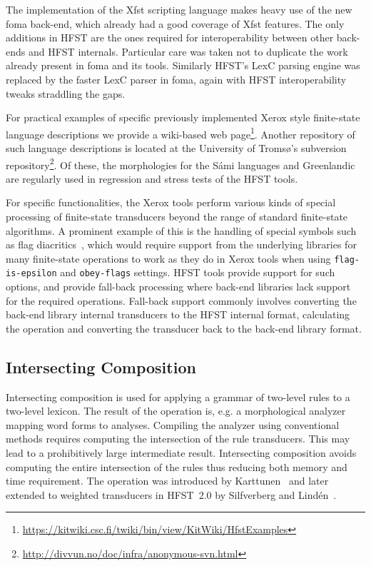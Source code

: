 \documentclass{llncs}
\begin{document}
The implementation of the Xfst scripting language makes heavy
use of the new foma back-end, which already had a good coverage of Xfst
features. The only additions in HFST are the ones required for
interoperability between other back-ends and HFST internals. Particular
care was taken not to duplicate the work already present in foma and its
tools. Similarly HFST's LexC parsing engine was
replaced by the faster LexC parser in foma, again with HFST interoperability
tweaks straddling the gaps.

For practical examples of specific previously implemented Xerox style finite-state
language descriptions we provide a wiki-based web page\footnote{\url{https://kitwiki.csc.fi/twiki/bin/view/KitWiki/HfstExamples}}. Another repository of
such language descriptions is located at the University of Tromsø's subversion
repository\footnote{\url{http://divvun.no/doc/infra/anonymous-svn.html}}.
Of these, the morphologies for the Sámi languages and Greenlandic are 
regularly used in regression and stress tests of the HFST tools.

For specific functionalities, the Xerox tools perform various kinds of special
processing of finite-state transducers beyond the range of standard finite-state
algorithms. A prominent example of this is the handling of special symbols such
as flag diacritics~\cite{beesley/1998}, which would require support from
the underlying libraries for many finite-state operations to work as they do in
Xerox tools when using \texttt{flag-is-epsilon} and \texttt{obey-flags}
settings. HFST tools provide support for such options, and provide
fall-back processing where back-end libraries lack support for the
required operations. Fall-back support commonly involves converting the
back-end library internal transducers to the HFST internal format, calculating the operation
and converting the transducer back to the back-end library format. 

\subsection{Intersecting Composition}
Intersecting composition is used for applying a grammar of two-level
rules to a two-level lexicon. The result of the operation
is, e.g. a morphological analyzer mapping word forms to
analyses. Compiling the analyzer using conventional methods requires
computing the intersection of the rule transducers. This may lead to a
prohibitively large intermediate result. Intersecting composition
avoids computing the entire intersection of the rules thus reducing
both memory and time requirement. The operation was introduced by
Karttunen~\cite{Karttunen/1994} and later extended to weighted
transducers in HFST~2.0 by Silfverberg and Lind\'{e}n~\cite{silfverberg/2009/2}.
\end{document}

